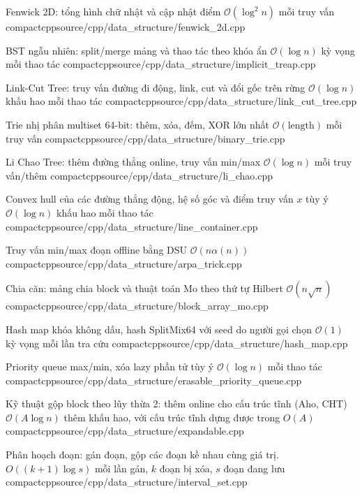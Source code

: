 {Fenwick 2D: tổng hình chữ nhật và cập nhật điểm}
{$\mathcal{O}(\log^2 n)$ mỗi truy vấn}
{compactcpp}{source/cpp/data_structure/fenwick_2d.cpp}

{BST ngẫu nhiên: split/merge mảng và thao tác theo khóa ẩn}
{$\mathcal{O}(\log n)$ kỳ vọng mỗi thao tác}
{compactcpp}{source/cpp/data_structure/implicit_treap.cpp}

{Link-Cut Tree: truy vấn đường đi động, link, cut và đổi gốc trên rừng}
{$\mathcal{O}(\log n)$ khấu hao mỗi thao tác}
{compactcpp}{source/cpp/data_structure/link_cut_tree.cpp}

{Trie nhị phân multiset 64-bit: thêm, xóa, đếm, XOR lớn nhất}
{$\mathcal{O}(\text{length})$ mỗi truy vấn}
{compactcpp}{source/cpp/data_structure/binary_trie.cpp}

{Li Chao Tree: thêm đường thẳng online, truy vấn min/max}
{$\mathcal{O}(\log n)$ mỗi truy vấn/thêm}
{compactcpp}{source/cpp/data_structure/li_chao.cpp}

{Convex hull của các đường thẳng động, hệ số góc và điểm truy vấn $x$ tùy ý}
{$\mathcal{O}(\log n)$ khấu hao mỗi thao tác}
{compactcpp}{source/cpp/data_structure/line_container.cpp}

{Truy vấn min/max đoạn offline bằng DSU}
{$\mathcal{O}(n \alpha(n))$}
{compactcpp}{source/cpp/data_structure/arpa_trick.cpp}

{Chia căn: mảng chia block và thuật toán Mo theo thứ tự Hilbert}
{$\mathcal{O}(n \sqrt{n})$}
{compactcpp}{source/cpp/data_structure/block_array_mo.cpp}

{Hash map khóa không dấu, hash SplitMix64 với seed do người gọi chọn}
{$\mathcal{O}(1)$ kỳ vọng mỗi lần tra cứu}
{compactcpp}{source/cpp/data_structure/hash_map.cpp}

{Priority queue max/min, xóa lazy phần tử tùy ý}
{$\mathcal{O}(\log n)$ mỗi thao tác}
{compactcpp}{source/cpp/data_structure/erasable_priority_queue.cpp}

{Kỹ thuật gộp block theo lũy thừa 2: thêm online cho cấu trúc tĩnh (Aho, CHT)}
{$\mathcal{O}(A \log n)$ thêm khấu hao, với cấu trúc tĩnh dựng được trong $O(A)$}
{compactcpp}{source/cpp/data_structure/expandable.cpp}

{Phân hoạch đoạn: gán đoạn, gộp các đoạn kề nhau cùng giá trị.}
{$O((k+1)\log s)$ mỗi lần gán, $k$ đoạn bị xóa, $s$ đoạn đang lưu}
{compactcpp}{source/cpp/data_structure/interval_set.cpp}
